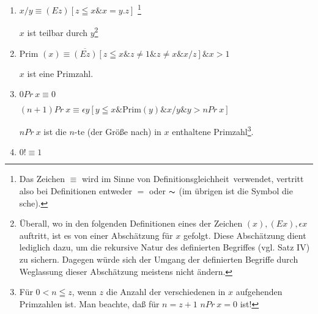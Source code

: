 \documentclass[draft]{scrartcl}
\begin{document}
\label{genaueformeln}
\begin{enumerate}[1.]
	\item {}$x/y \equiv \left(Ez\right) \left[z \leqq x \& x = y.z\right]$%
%
\footnote{Das Zeichen $\equiv$ wird im Sinne von \glqq Definitionsgleichheit\grqq\ verwendet, vertritt also bei Definitionen entweder $=$ oder $\thicksim$ (im übrigen ist
	die Symbol die sche).}

		$x$ ist teilbar durch $y$\footnote{Überall, wo in den folgenden Definitionen eines der Zeichen $\left(x\right), \left(Ex\right), \epsilon x$ auftritt, ist es von einer Abschätzung für $x$ gefolgt. Diese Abschätzung dient lediglich dazu, um die rekursive Natur des definierten Begriffes (vgl. Satz IV) zu sichern. Dagegen würde sich der Umgang der definierten Begriffe durch Weglassung dieser Abschätzung meistens nicht ändern.}

	\item {}$\text{Prim }\left(x\right) \equiv \overline{\left(Ez\right)} \left[z \leqq x \& z \neq 1 \& z \not = x \& x/z\right] \& x > 1$

	$x$ ist eine Primzahl.

	\item {} $0 Pr\ x \equiv 0$%

	$\left(n + 1\right) Pr\ x \equiv \epsilon y \left[y \leqq x \& \text{Prim}\left(y\right) \& x/y \& y > n Pr\ x\right]$%
	\let\originalfootnote=\thefootnote
	\let\thefootnote=\fnvierunddreissiga

	$n Pr\ x$ ist die $n$-te (der Größe nach) in $x$ enthaltene
		Primzahl\footnote{Für $0 < n \leqq z$, wenn $z$ die Anzahl der verschiedenen
		in $x$ aufgehenden Primzahlen ist. Man beachte, daß für $n = z + 1$ \hspace{0.3cm} $n Pr\ x = 0$ ist!}.
	\let\thefootnote=\originalfootnote
	\setcounter{footnote}{35}

	\item {}$0! \equiv 1$


\end{enumerate}
\end{document}
